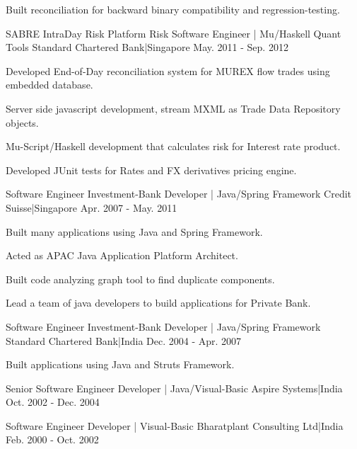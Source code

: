 \begin{cventries}
{\begin{cvitems}
        \item {Built reconciliation for backward binary compatibility and regression-testing.}
      \end{cvitems}
    }
  \cventry
    {SABRE IntraDay Risk Platform}
    {Risk Software Engineer | Mu/Haskell Quant Tools}
    {Standard Chartered Bank|Singapore}
    {May. 2011 - Sep. 2012}
    {
      \begin{cvitems}
        \item {Developed End-of-Day reconciliation system for MUREX flow trades using embedded database.}
        \item {Server side javascript development, stream MXML as Trade Data Repository objects.}
        \item {Mu-Script/Haskell development that calculates risk for Interest rate product.}
        \item {Developed JUnit tests for Rates and FX derivatives pricing engine.}
      \end{cvitems}
    }
  \cventry
    {Software Engineer}
    {Investment-Bank Developer | Java/Spring Framework}
    {Credit Suisse|Singapore}
    {Apr. 2007 - May. 2011}
    {
      \begin{cvitems}
        \item {Built many applications using Java and Spring Framework.}
        \item {Acted as APAC Java Application Platform Architect.}
        \item {Built code analyzing graph tool to find duplicate components.}
        \item {Lead a team of java developers to build applications for Private Bank.}
      \end{cvitems}
    }
  \cventry
    {Software Engineer}
    {Investment-Bank Developer | Java/Spring Framework}
    {Standard Chartered Bank|India}
    {Dec. 2004 - Apr. 2007}
    {
      \begin{cvitems}
        \item {Built applications using Java and Struts Framework.}
      \end{cvitems}
    }
  \cventry
    {Senior Software Engineer}
    {Developer | Java/Visual-Basic}
    {Aspire Systems|India}
    {Oct. 2002 - Dec. 2004}
    {
      \begin{cvitems}
      \end{cvitems}
    }
  \cventry
    {Software Engineer}
    {Developer | Visual-Basic}
    {Bharatplant Consulting Ltd|India}
    {Feb. 2000 - Oct. 2002}
    {
      \begin{cvitems}
      \end{cvitems}
    }
\end{cventries}
